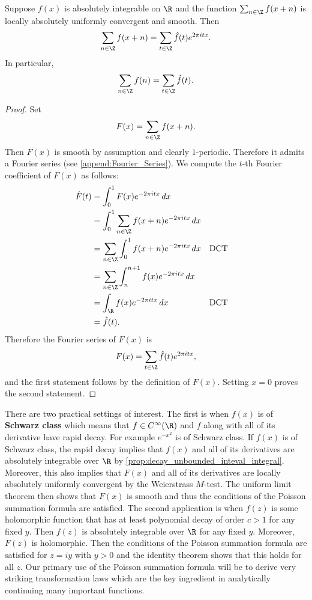         \begin{theorem}
          Suppose $f(x)$ is absolutely integrable on $\R$ and the function $\sum_{n \in \Z}f(x+n)$ is locally absolutely uniformly convergent and smooth. Then
          \[
            \sum_{n \in \Z}f(x+n) = \sum_{t \in \Z}\hat{f}(t)e^{2\pi itx}.
          \]
          In particular,
          \[
            \sum_{n \in \Z}f(n) = \sum_{t \in \Z}\hat{f}(t).
          \]
        \end{theorem}
        \begin{proof}
          Set
          \[
            F(x) = \sum_{n \in \Z}f(x+n).
          \]
          Then $F(x)$ is smooth by assumption and clearly $1$-periodic. Therefore it admits a Fourier series (see \cref{append:Fourier_Series}). We compute the $t$-th Fourier coefficient of $F(x)$ as follows:
          \begin{align*}
            \hat{F}(t) &= \int_{0}^{1}F(x)e^{-2\pi itx}\,dx \\
            &= \int_{0}^{1}\sum_{n \in \Z}f(x+n)e^{-2\pi itx}\,dx \\
            &= \sum_{n \in \Z}\int_{0}^{1}f(x+n)e^{-2\pi itx}\,dx && \text{DCT} \\
            &= \sum_{n \in \Z}\int_{n}^{n+1}f(x)e^{-2\pi itx}\,dx \\
            &= \int_{\R}f(x)e^{-2\pi itx}\,dx && \text{DCT} \\
            &= \hat{f}(t).
          \end{align*}
          Therefore the Fourier series of $F(x)$ is
          \[
            F(x) = \sum_{t \in \Z}\hat{f}(t)e^{2\pi itx},
          \]
          and the first statement follows by the definition of $F(x)$. Setting $x = 0$ proves the second statement.
        \end{proof}

        There are two practical settings of interest. The first is when $f(x)$ is of \textbf{Schwarz class} which means that $f \in C^{\infty}(\R)$ and $f$ along with all of its derivative have rapid decay. For example $e^{-x^{2}}$ is of Schwarz class. If $f(x)$ is of Schwarz class, the rapid decay implies that $f(x)$ and all of its derivatives are absolutely integrable over $\R$ by \cref{prop:decay_unbounded_inteval_integral}. Moreover, this also implies that $F(x)$ and all of its derivatives are locally absolutely uniformly convergent by the Weierstrass $M$-test. The uniform limit theorem then shows that $F(x)$ is smooth and thus the conditions of the Poisson summation formula are satisfied. The second application is when $f(z)$ is some holomorphic function that has at least polynomial decay of order $c > 1$ for any fixed $y$. Then $f(z)$ is absolutely integrable over $\R$ for any fixed $y$. Moreover, $F(z)$ is holomorphic. Then the conditions of the Poisson summation formula are satisfied for $z = iy$ with $y > 0$ and the identity theorem shows that this holds for all $z$. Our primary use of the Poisson summation formula will be to derive very striking transformation laws which are the key ingredient in analytically continuing many important functions.
